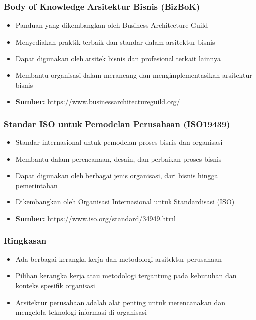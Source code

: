 \documentclass{beamer}
\begin{document}
	
	\begin{frame}
		\frametitle{Body of Knowledge Arsitektur Bisnis (BizBoK)}
		\begin{itemize}
			\item Panduan yang dikembangkan oleh Business Architecture Guild
			\item Menyediakan praktik terbaik dan standar dalam arsitektur bisnis
			\item Dapat digunakan oleh arsitek bisnis dan profesional terkait lainnya
			\item Membantu organisasi dalam merancang dan mengimplementasikan arsitektur bisnis
			\item \textbf{Sumber:} \url{https://www.businessarchitectureguild.org/}
		\end{itemize}
	\end{frame}
	
	\begin{frame}
		\frametitle{Standar ISO untuk Pemodelan Perusahaan (ISO19439)}
		\begin{itemize}
			\item Standar internasional untuk pemodelan proses bisnis dan organisasi
			\item Membantu dalam perencanaan, desain, dan perbaikan proses bisnis
			\item Dapat digunakan oleh berbagai jenis organisasi, dari bisnis hingga pemerintahan
			\item Dikembangkan oleh Organisasi Internasional untuk Standardisasi (ISO)
			\item \textbf{Sumber:} \url{https://www.iso.org/standard/34949.html}
		\end{itemize}
	\end{frame}
	
	\begin{frame}
		\frametitle{Ringkasan}
		\begin{itemize}
			\item Ada berbagai kerangka kerja dan metodologi arsitektur perusahaan
			\item Pilihan kerangka kerja atau metodologi tergantung pada kebutuhan dan konteks spesifik organisasi
			\item Arsitektur perusahaan adalah alat penting untuk merencanakan dan mengelola teknologi informasi di organisasi
		\end{itemize}
	\end{frame}
	
\end{document}
